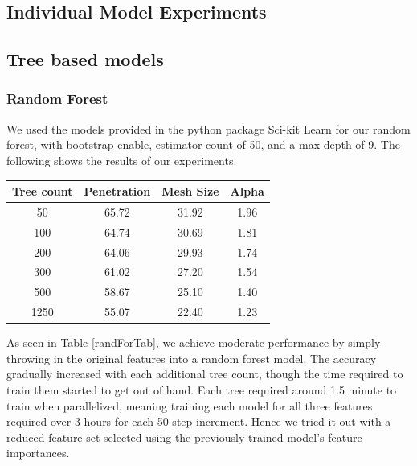 \documentclass[a4paper, 12pt]{article}
\begin{document}
\begin{multicols}{2}
        \section{Individual Model Experiments}        
            \subsection{Tree based models}
                \subsubsection{Random Forest}
                We used the models provided in the python package Sci-kit Learn \cite{scikit-learn} for our random forest, with bootstrap enable, estimator count of 50, and a max depth of 9. The following shows the results of our experiments.
                \begin{center}
                    \begin{tabular}{c|ccc}
                        Tree count & Penetration & Mesh Size & Alpha\\
                        \hline
                        50 & 65.72 & 31.92 & 1.96 \\
                        100 & 64.74 & 30.69 & 1.81 \\
                        200 & 64.06 & 29.93 & 1.74 \\
                        300 & 61.02 & 27.20 & 1.54 \\
                        500 & 58.67 & 25.10 & 1.40 \\
                        1250 & 55.07 & 22.40 & 1.23
                    \end{tabular}
                    \label{randForTab}
                \end{center}

                As seen in Table \ref{randForTab}, we achieve moderate performance by simply throwing in the original features into a random forest model. The accuracy gradually increased with each additional tree count, though the time required to train them started to get out of hand. Each tree required around 1.5 minute to train when parallelized, meaning training each model for all three features required over 3 hours for each 50 step increment. Hence we tried it out with a reduced feature set selected using the previously trained model's feature importances.


\end{multicols}
\end{document}
